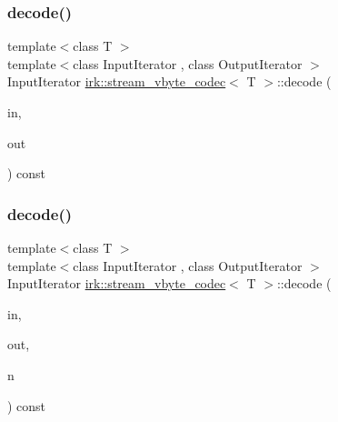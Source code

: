 \subsubsection{\texorpdfstring{decode()}{decode()}\hspace{0.1cm}{\footnotesize\ttfamily [1/2]}}
{\footnotesize\ttfamily template$<$class T $>$ \\
template$<$class Input\+Iterator , class Output\+Iterator $>$ \\
Input\+Iterator \mbox{\hyperlink{structirk_1_1stream__vbyte__codec}{irk\+::stream\+\_\+vbyte\+\_\+codec}}$<$ T $>$\+::decode (\begin{DoxyParamCaption}\item[{Input\+Iterator}]{in,  }\item[{Output\+Iterator}]{out }\end{DoxyParamCaption}) const\hspace{0.3cm}{\ttfamily [inline]}}

\mbox{\label{structirk_1_1stream__vbyte__codec_a8864b6ac48c12a0b25d8cab765474fdd}} 
\subsubsection{\texorpdfstring{decode()}{decode()}\hspace{0.1cm}{\footnotesize\ttfamily [2/2]}}
{\footnotesize\ttfamily template$<$class T $>$ \\
template$<$class Input\+Iterator , class Output\+Iterator $>$ \\
Input\+Iterator \mbox{\hyperlink{structirk_1_1stream__vbyte__codec}{irk\+::stream\+\_\+vbyte\+\_\+codec}}$<$ T $>$\+::decode (\begin{DoxyParamCaption}\item[{Input\+Iterator}]{in,  }\item[{Output\+Iterator}]{out,  }\item[{int}]{n }\end{DoxyParamCaption}) const\hspace{0.3cm}{\ttfamily [inline]}}

\mbox{\label{structirk_1_1stream__vbyte__codec_a960d285d3f6dda37976597743f0186e8}} 
